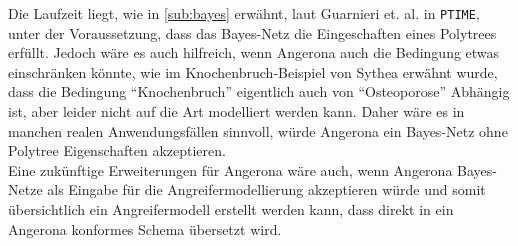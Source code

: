 \documentclass[german,version-2020-11]{uzl-thesis}
\begin{document}
Die Laufzeit liegt, wie in \cref{sub:bayes} erwähnt, laut Guarnieri et. al. \cite{guarnieri2017securing} in \texttt{PTIME}, unter der Voraussetzung, dass das Bayes-Netz die Eingeschaften eines Polytrees erfüllt. Jedoch wäre es auch hilfreich, wenn Angerona auch die Bedingung etwas einschränken könnte, wie im Knochenbruch-Beispiel von Sythea erwähnt wurde, dass die Bedingung \enquote{Knochenbruch} eigentlich auch von \enquote{Osteoporose} Abhängig ist, aber leider nicht auf die Art modelliert werden kann. Daher wäre es in manchen realen Anwendungsfällen sinnvoll, würde Angerona ein Bayes-Netz ohne Polytree Eigenschaften akzeptieren. \\ 
Eine zukünftige Erweiterungen für Angerona wäre auch, wenn Angerona Bayes-Netze als Eingabe für die Angreifermodellierung akzeptieren würde und somit übersichtlich ein Angreifermodell erstellt werden kann, dass direkt in ein Angerona konformes Schema übersetzt wird.





%
\end{document}
